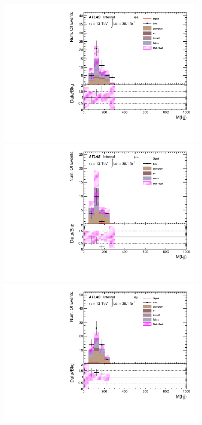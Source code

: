 \begin{figure}[h]
\begin{minipage}[t]{0.33\linewidth}
 \centering
 \includegraphics[width=0.9\textwidth,angle=-90]{fig/SigOpt/mH400_m_l1jj_ee.pdf}
 \end{minipage}
 \begin{minipage}[t]{0.33\linewidth}
 \centering
 \includegraphics[width=0.9\textwidth,angle=-90]{fig/SigOpt/mH400_m_l1jj_mumu.pdf}
 \end{minipage}
 \begin{minipage}[t]{0.33\linewidth}
 \centering
 \includegraphics[width=0.9\textwidth,angle=-90]{fig/SigOpt/mH400_m_l1jj_emu.pdf}

\end{minipage}
\end{figure}
